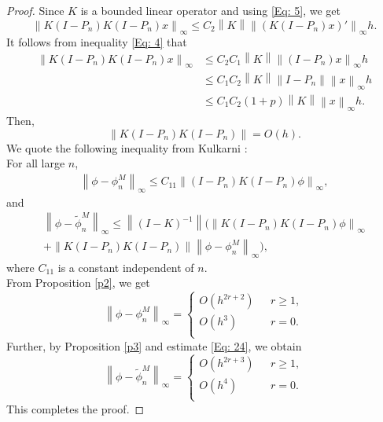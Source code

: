 \documentclass[sn-mathphys-num]{sn-jnl}%
\theoremstyle{thmstyleone}%
\theoremstyle{thmstyletwo}%
\theoremstyle{thmstylethree}%
\newcommand{\norm}[1]{\left\lVert #1\right\rVert}
\begin{document}
\begin{proof}
	Since $K$ is a bounded linear operator and using \eqref{Eq: 5}, we get
	$$
	\norm{K(I - P_n)K(I - P_n) x}_\infty \le C_2 \norm{K} \norm{(K(I - P_n) x)'}_\infty h.
	$$
	It follows from inequality \eqref{Eq: 4} that
	\begin{align*}
		\norm{K(I - P_n)K(I - P_n) x}_\infty
		&\le C_2 C_1  \norm{K} \norm{(I - P_n) x}_\infty h \\
		&\le  C_1 C_2 \norm{K} \norm{I - P_n} \norm{x}_\infty h \\
		&\le C_1 C_2 (1 + p) \norm{K} \norm{x}_\infty h.
	\end{align*}
	Then, 
	\begin{equation}\label{Eq: 24}
		\norm{K(I - P_n)K(I - P_n)} = O(h).
	\end{equation} 
	We quote the following inequality from Kulkarni \cite{RPK1}:\\
	For all large $n$,
	\begin{align*}
		\norm{\phi - \phi_n^M }_\infty \leq C_{11} \norm{(I - P_n)K(I - P_n)\phi}_\infty,
	\end{align*} and
	\begin{align*}
		\norm{\phi - \tilde{\phi}_n^M }_\infty \leq  \norm{(I - K)^{-1}} ( \norm{K(I - P_n)K(I - P_n)\phi}_\infty \\ + \norm{K(I - P_n)K(I - P_n)} \norm{\phi - \phi_n^M }_\infty ),
	\end{align*}
	where $C_{11}$ is a constant independent of $n$.\\
	From Proposition \ref{p2}, we get
	$$
	\norm{\phi - \phi_n^M }_\infty = 
	\begin{cases}
		O\left(h^{2r + 2}\right)~~~          &  r \ge 1,\\
		O\left(h^{3}\right)~~~          & r=0.\\
	\end{cases} 
	$$
	Further, by Proposition \ref{p3} and estimate \eqref{Eq: 24}, we obtain
	$$ 
	\norm{\phi - \tilde{\phi}_n^M }_\infty = 
	\begin{cases}
		O\left(h^{2r + 3}\right)~~~          &  r \ge 1,\\
		O\left(h^{4}\right)~~~          & r=0.\\
	\end{cases} 
	$$
	This completes the proof.
\end{proof}

\end{document}
